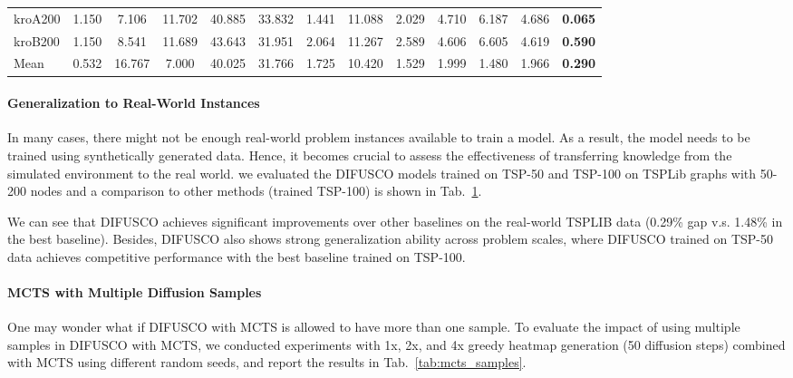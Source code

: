\begin{table}[t]
{\begin{tabular}{lcccccccccccc}
kroA200   & 1.150 & 7.106 & 11.702 & 40.885 & 33.832 & 1.441 & 11.088 & 2.029 & 4.710 & 6.187 & 4.686 & \textbf{0.065} \\
kroB200   & 1.150 & 8.541 & 11.689 & 43.643 & 31.951 & 2.064 & 11.267 & 2.589 & 4.606 & 6.605 & 4.619 & \textbf{0.590} \\
\midrule
Mean      & 0.532 & 16.767 & 7.000 & 40.025 & 31.766 & 1.725 & 10.420 & 1.529 & 1.999 & 1.480 & 1.966 & \textbf{0.290} \\
\bottomrule
\end{tabular}
}
\label{tab:tsplib}
\end{table}
\setlength{\tabcolsep}{6pt}


\paragraph{Generalization to Real-World Instances}\label{sec:tsplib}

In many cases, there might not be enough real-world problem instances available to train a model. As a result, the model needs to be trained using synthetically generated data. Hence, it becomes crucial to assess the effectiveness of transferring knowledge from the simulated environment to the real world. 
we evaluated the DIFUSCO models trained on TSP-50 and TSP-100 on TSPLib graphs with 50-200 nodes and a comparison to other methods (trained TSP-100) \citep{19iclr-am,joshi2019efficient,d2020learning,hudson2022graph} is shown in Tab.~\ref{tab:tsplib}.

We can see that DIFUSCO achieves significant improvements over other baselines on the real-world TSPLIB data (0.29\% gap v.s. 1.48\% in the best baseline). Besides, DIFUSCO also shows strong generalization ability across problem scales, where DIFUSCO trained on TSP-50 data achieves competitive performance with the best baseline \citet{hudson2022graph} trained on TSP-100.

\paragraph{MCTS with Multiple Diffusion Samples}

One may wonder what if DIFUSCO with MCTS is allowed to have more than one sample. To evaluate the impact of using multiple samples in DIFUSCO with MCTS, we conducted experiments with 1x, 2x, and 4x greedy heatmap generation (50 diffusion steps) combined with MCTS using different random seeds, and report the results in Tab.~\ref{tab:mcts_samples}.

